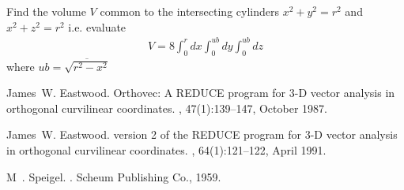 \example{}

Find the volume $V$ common to the intersecting cylinders $x^2 + y^2 
= r^2$ and $x^2 + z^2 = r^2$ i.e. evaluate
\begin{eqnarray*}
V = 8 \int^r_0 dx \int^{ub}_0 dy \int^{ub}_0 dz
\end{eqnarray*}
where $ub = \overline{\sqrt { r^2 - x^2}}$

\begin{thebibliography}{1}

James~W. Eastwood.
\newblock Orthovec: A {REDUCE} program for {3-D} vector analysis in orthogonal
  curvilinear coordinates.
, 47(1):139--147, October 1987.

James~W. Eastwood.
 version 2 of the {REDUCE} program for {3-D} vector
  analysis in orthogonal curvilinear coordinates.
, 64(1):121--122, April 1991.

M~. Speigel.
.
\newblock Scheum Publishing Co., 1959.

\end{thebibliography}
